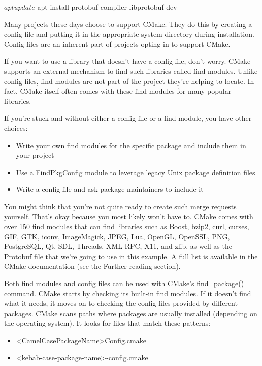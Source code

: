 \begin{shell}
$ apt update
$ apt install protobuf-compiler libprotobuf-dev
\end{shell}

Many projects these days choose to support CMake. They do this by creating a config file and putting it in the appropriate system directory during installation. Config files are an inherent part of projects opting in to support CMake.

If you want to use a library that doesn’t have a config file, don’t worry. CMake supports an external mechanism to find such libraries called find modules. Unlike config files, find modules are not part of the project they’re helping to locate. In fact, CMake itself often comes with these find modules for many popular libraries.

If you’re stuck and without either a config file or a find module, you have other choices:

\begin{itemize}
\item
Write your own find modules for the specific package and include them in your project

\item
Use a FindPkgConfig module to leverage legacy Unix package definition files

\item
Write a config file and ask package maintainers to include it
\end{itemize}

You might think that you’re not quite ready to create such merge requests yourself. That’s okay because you most likely won’t have to. CMake comes with over 150 find modules that can find libraries such as Boost, bzip2, curl, curses, GIF, GTK, iconv, ImageMagick, JPEG, Lua, OpenGL, OpenSSL, PNG, PostgreSQL, Qt, SDL, Threads, XML-RPC, X11, and zlib, as well as the Protobuf file that we’re going to use in this example. A full list is available in the CMake documentation (see the Further reading section).

Both find modules and config files can be used with CMake’s find\_package() command. CMake starts by checking its built-in find modules. If it doesn’t find what it needs, it moves on to checking the config files provided by different packages. CMake scans paths where packages are usually installed (depending on the operating system). It looks for files that match these patterns:

\begin{itemize}
\item
<CamelCasePackageName>Config.cmake

\item
<kebab-case-package-name>-config.cmake
\end{itemize}

